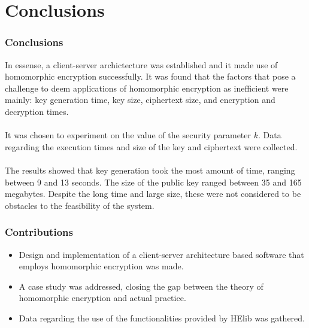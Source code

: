 \documentclass{beamer}
\begin{document}
\section{Conclusions}
\begin{frame}
\frametitle{Conclusions}

In essense, a client-server archictecture was established and it made use of homomorphic encryption successfully. It was found that the factors that pose a challenge to deem applications of homomorphic encryption as inefficient were mainly: key generation time, key size, ciphertext size, and encryption and decryption times. \\~\\

It was chosen to experiment on the value of the security parameter $k$. Data regarding the execution times and size of the key and ciphertext were collected. \\~\\

The results showed that key generation took the most amount of time, ranging between 9 and 13 seconds. The size of the public key ranged between 35 and 165 megabytes. Despite the long time and large size, these were not considered to be obstacles to the feasibility of the system. 

\end{frame}
\begin{frame}
\frametitle{Contributions}
\begin{itemize}
  \setlength\itemsep{1.5em}
\item Design and implementation of a client-server architecture based software that employs homomorphic encryption was made.
\item A case study was addressed, closing the gap between the theory of homomorphic encryption and actual practice.
\item Data regarding the use of the functionalities provided by HElib was gathered.
\end{itemize}
\end{frame}
\end{document}
